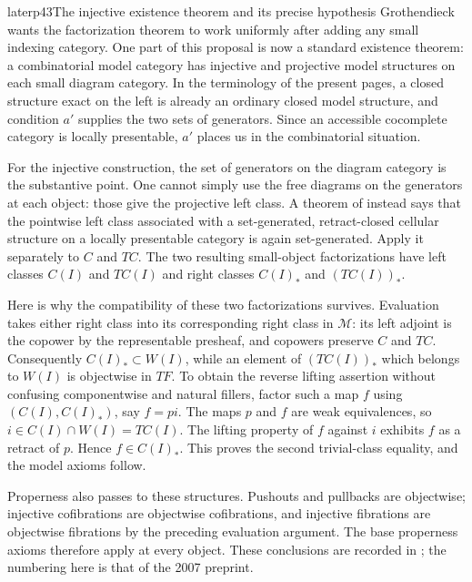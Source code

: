 \begin{dcomment}{later}{p43}{The injective existence theorem and its precise hypothesis}
Grothendieck wants the factorization theorem to work uniformly after adding any small indexing category. One part of this proposal is now a standard existence theorem: a combinatorial model category has injective and projective model structures on each small diagram category. In the terminology of the present pages, a closed structure exact on the left is already an ordinary closed model structure, and condition $a'$ supplies the two sets of generators. Since an accessible cocomplete category is locally presentable, $a'$ places us in the combinatorial situation.

For the injective construction, the set of generators on the diagram category is the substantive point. One cannot simply use the free diagrams on the generators at each object: those give the projective left class. A theorem of \citet[Corollary~3.4, author preprint of 21 November 2013]{MakkaiRosicky2014Cellular} instead says that the pointwise left class associated with a set-generated, retract-closed cellular structure on a locally presentable category is again set-generated. Apply it separately to $C$ and $TC$. The two resulting small-object factorizations have left classes $C(I)$ and $TC(I)$ and right classes $C(I)_*$ and $(TC(I))_*$.

Here is why the compatibility of these two factorizations survives. Evaluation takes either right class into its corresponding right class in $\mathcal M$: its left adjoint is the copower by the representable presheaf, and copowers preserve $C$ and $TC$. Consequently $C(I)_*\subset W(I)$, while an element of $(TC(I))_*$ which belongs to $W(I)$ is objectwise in $TF$. To obtain the reverse lifting assertion without confusing componentwise and natural fillers, factor such a map $f$ using $(C(I),C(I)_*)$, say $f=pi$. The maps $p$ and $f$ are weak equivalences, so $i\in C(I)\cap W(I)=TC(I)$. The lifting property of $f$ against $i$ exhibits $f$ as a retract of $p$. Hence $f\in C(I)_*$. This proves the second trivial-class equality, and the model axioms follow.

Properness also passes to these structures. Pushouts and pullbacks are objectwise; injective cofibrations are objectwise cofibrations, and injective fibrations are objectwise fibrations by the preceding evaluation argument. The base properness axioms therefore apply at every object. These conclusions are recorded in \citet[Theorems~1.17 and 1.19, Propositions~1.21--1.22]{Barwick2007}; the numbering here is that of the 2007 preprint.


\end{dcomment}
